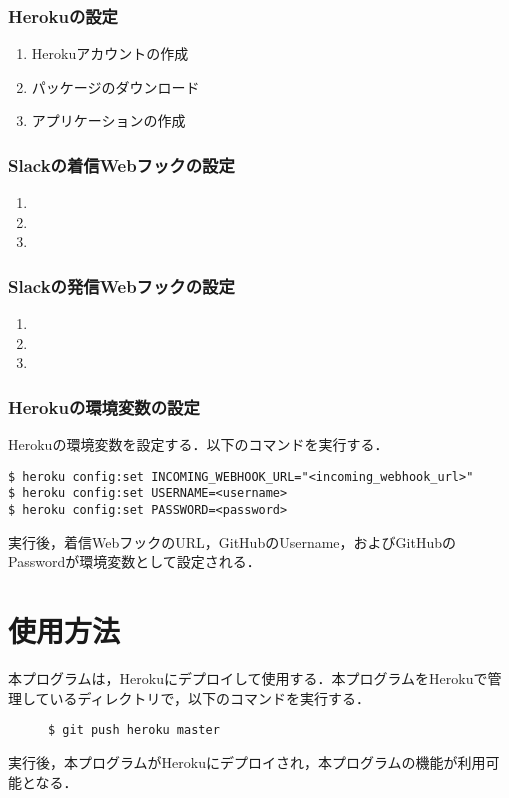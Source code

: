 \documentclass[12pt]{jsarticle}
\begin{document}
\subsubsection{Herokuの設定}
\begin{enumerate}
\item Herokuアカウントの作成
\item パッケージのダウンロード
\item アプリケーションの作成
\end{enumerate}
\subsubsection{Slackの着信Webフックの設定}
\begin{enumerate}
\item 
\item
\item 
\end{enumerate}
\subsubsection{Slackの発信Webフックの設定}
\begin{enumerate}
\item 
\item 
\item 
\end{enumerate}
\subsubsection{Herokuの環境変数の設定}
Herokuの環境変数を設定する．以下のコマンドを実行する．
\begin{description}
\item \verb|$ heroku config:set INCOMING_WEBHOOK_URL="<incoming_webhook_url>"|\\
\verb|$ heroku config:set USERNAME=<username>|\\
\verb|$ heroku config:set PASSWORD=<password>|
\end{description}
実行後，着信WebフックのURL，GitHubのUsername，およびGitHubのPasswordが環境変数として設定される．
\section{使用方法}
本プログラムは，Herokuにデプロイして使用する．本プログラムをHerokuで管理しているディレクトリで，以下のコマンドを実行する．
\begin{description}
\item[] \verb|$ git push heroku master|
\end{description}
実行後，本プログラムがHerokuにデプロイされ，本プログラムの機能が利用可能となる．
\end{document}
